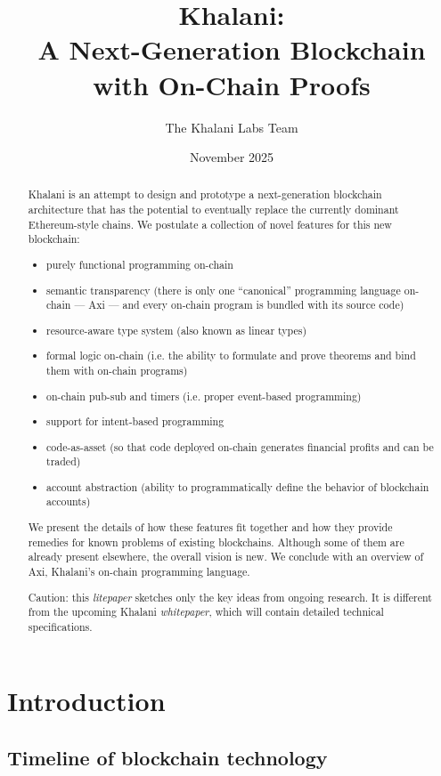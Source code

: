 \documentclass[a4paper]{article}
\title{Khalani: \\ A Next-Generation Blockchain with On-Chain Proofs}
\author{The Khalani Labs Team}
\date{November 2025}
\begin{document}
\maketitle

\begin{abstract}
Khalani is an attempt to design and prototype a next-generation blockchain architecture that has the potential to eventually replace the currently dominant Ethereum-style chains. We postulate a collection of novel features for this new blockchain:

\begin{itemize}
  \item purely functional programming on-chain
  \item semantic transparency (there is only one ``canonical'' programming language on-chain --- Axi --- and every on-chain program is bundled with its source code)
  \item resource-aware type system (also known as linear types)
  \item formal logic on-chain (i.e. the ability to formulate and prove theorems and bind them with on-chain programs)
  \item on-chain pub-sub and timers (i.e. proper event-based programming)
  \item support for intent-based programming
  \item code-as-asset (so that code deployed on-chain generates financial profits and can be traded)
  \item account abstraction (ability to programmatically define the behavior of blockchain accounts)
\end{itemize}

We present the details of how these features fit together and how they provide remedies for known problems of existing blockchains. Although some of them are already present elsewhere, the overall vision is new. We conclude with an overview of Axi, Khalani's on-chain programming language.

Caution: this \textit{litepaper} sketches only the key ideas from ongoing research. It is different from the upcoming Khalani \textit{whitepaper}, which will contain detailed technical specifications.
\end{abstract}

\section{Introduction}

\subsection{Timeline of blockchain technology}
\end{document}
